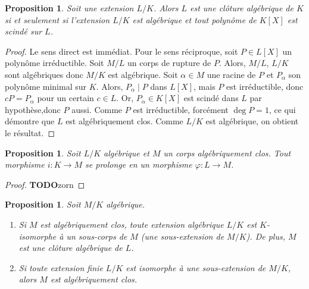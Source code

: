 \documentclass{article}
\newcommand{\todo}{\textbf{TODO}}
\theoremstyle{plain}
\newtheorem{proposition}[theorem]{Proposition}
\theoremstyle{definition}
\theoremstyle{remark}
\begin{document}
\begin{proposition} \label{propclotalgpolscinde}
    Soit une extension $L/K$. Alors $L$ est une clôture algébrique de $K$ si et seulement si l'extension $L/K$ est algébrique et tout polynôme de $K[X]$ est scindé sur $L$.
\end{proposition}

\begin{proof}
    Le sens direct est immédiat. Pour le sens réciproque, soit $P \in L[X]$ un polynôme irréductible. Soit $M/L$ un corps de rupture de $P$. Alors, $M/L$, $L/K$ sont algébriques donc $M/K$ est algébrique. Soit $\alpha \in M$ une racine de $P$ et $P_\alpha$ son polynôme minimal sur $K$. Alors, $P_\alpha \mid P$ dans $L[X]$, mais $P$ est irréductible, donc $c P = P_\alpha$ pour un certain $c\in L$. Or, $P_\alpha \in K[X]$ est scindé dans $L$ par hypothèse,donc $P$ aussi. Comme $P$ est irréductible, forcément $\deg P = 1$, ce qui démontre que $L$ est algébriquement clos. Comme $L/K$ est algébrique, on obtient le résultat.
\end{proof}

\begin{proposition}
    Soit $L/K$ algébrique et $M$ un corps algébriquement clos. Tout morphisme $i : K \to M$ se prolonge en un morphisme $\varphi : L \to M$.
    \begin{center}
    \end{center}
\end{proposition}

\begin{proof}
    \todo zorn
\end{proof}

\begin{proposition}
    Soit $M/K$ algébrique.
    \begin{enumerate}
        \item Si $M$ est algébriquement clos, toute extension algébrique $L/K$ est $K$-isomorphe à un sous-corps de $M$ (une sous-extension de $M/K$). De plus, $M$ est une clôture algébrique de $L$.
        \item Si toute extension finie $L/K$ est isomorphe à une sous-extension de $M/K$, alors $M$ est algébriquement clos.
    \end{enumerate}
\end{proposition}
\end{document}
